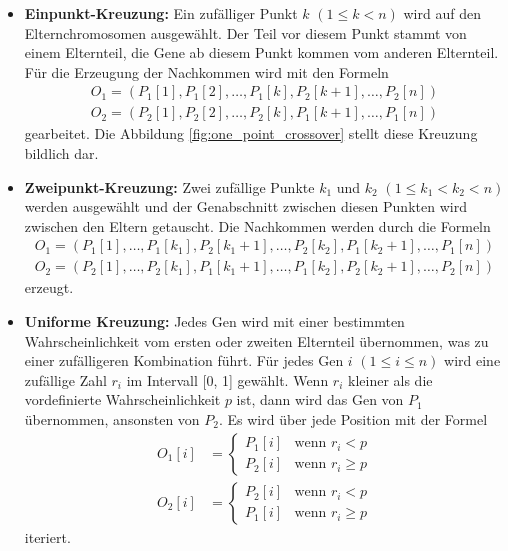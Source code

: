 \begin{itemize}
	\item \textbf{Einpunkt-Kreuzung:} Ein zufälliger Punkt \( k \) \((1 \leq k < n)\)
	wird auf den Elternchromosomen ausgewählt. Der Teil vor diesem Punkt stammt
	von einem Elternteil, die Gene ab diesem Punkt kommen vom anderen Elternteil. 
	Für die Erzeugung der Nachkommen wird mit den Formeln
	\begin{align*}
		O_1 = (P_1[1], P_1[2], \ldots, P_1[k], P_2[k+1], \ldots, P_2[n])\\
		O_2 = (P_2[1], P_2[2], \ldots, P_2[k], P_1[k+1], \ldots, P_1[n])
	\end{align*}
	gearbeitet. Die Abbildung \ref{fig:one_point_crossover} stellt diese Kreuzung bildlich dar.
	\item \textbf{Zweipunkt-Kreuzung:} Zwei zufällige Punkte \( k_1 \) und \( k_2 \)
	\((1 \leq k_1 < k_2 < n)\) werden ausgewählt und
	der Genabschnitt zwischen diesen Punkten wird zwischen den Eltern 
	getauscht. Die Nachkommen werden durch die Formeln
	\begin{align*}
		O_1 = (P_1[1], \ldots, P_1[k_1], P_2[k_1+1], \ldots, P_2[k_2], P_1[k_2+1], \ldots, P_1[n])\\
		O_2 = (P_2[1], \ldots, P_2[k_1], P_1[k_1+1], \ldots, P_1[k_2], P_2[k_2+1], \ldots, P_2[n])
	\end{align*}
	erzeugt.
	\item \textbf{Uniforme Kreuzung:} Jedes Gen wird mit einer bestimmten
	Wahrscheinlichkeit vom ersten oder zweiten Elternteil übernommen, was zu
	einer zufälligeren Kombination führt. Für jedes Gen \( i \) \((1 \leq i \leq n)\)
	wird eine zufällige Zahl \( r_i \) im Intervall [0, 1] gewählt. Wenn
	\( r_i \) kleiner als die vordefinierte Wahrscheinlichkeit \( p \) ist,
	dann wird das Gen von \( P_1 \) übernommen, ansonsten von \( P_2 \). Es
	wird über jede Position mit der Formel 
	\begin{align*}
		O_1[i] &=
		\begin{cases} 
			P_1[i] & \text{wenn } r_i < p       \\
			P_2[i] & \text{wenn } r_i \geq p 
		\end{cases}
		\\
		O_2[i] &=
		\begin{cases} 
			P_2[i] & \text{wenn } r_i < p       \\
			P_1[i] & \text{wenn } r_i \geq p 
		\end{cases}
	\end{align*}
	iteriert.
\end{itemize}

